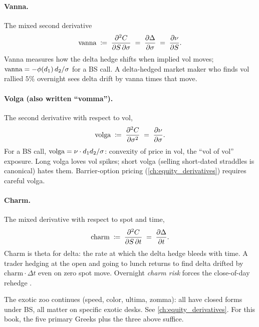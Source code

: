 \paragraph{Vanna.}
The mixed second derivative
\begin{equation*}
  \text{vanna} \;\coloneqq\; \frac{\partial^2 C}{\partial S\,\partial \sigma}
                  \;=\; \frac{\partial \Delta}{\partial \sigma}
                  \;=\; \frac{\partial \nu}{\partial S}.
\end{equation*}
Vanna measures how the delta hedge shifts when implied vol moves;
$\text{vanna} = -\phi(d_1)\,d_2/\sigma$ for a BS call. A
delta-hedged market maker who finds vol rallied $5\%$ overnight
sees delta drift by vanna times that move.

\paragraph{Volga (also written ``vomma'').}
The second derivative with respect to vol,
\begin{equation*}
  \text{volga} \;\coloneqq\; \frac{\partial^2 C}{\partial \sigma^2}
                  \;=\; \frac{\partial \nu}{\partial \sigma}.
\end{equation*}
For a BS call, $\text{volga} = \nu \cdot d_1 d_2 / \sigma$:
convexity of price in vol, the ``vol of vol'' exposure. Long volga
loves vol spikes; short volga (selling short-dated straddles is
canonical) hates them. Barrier-option pricing
(\cref{ch:equity_derivatives}) requires careful volga.

\paragraph{Charm.}
The mixed derivative with respect to spot and time,
\begin{equation*}
  \text{charm} \;\coloneqq\; \frac{\partial^2 C}{\partial S\,\partial t}
                  \;=\; \frac{\partial \Delta}{\partial t}.
\end{equation*}
Charm is theta for delta: the rate at which the delta hedge
bleeds with time. A trader hedging at the open and going to lunch
returns to find delta drifted by $\text{charm} \cdot \Delta t$
even on zero spot move. Overnight \emph{charm risk} forces the
close-of-day rehedge \citeHull.

The exotic zoo continues (speed, color, ultima, zomma): all have
closed forms under BS, all matter on specific exotic desks. See
\cref{ch:equity_derivatives}. For this book, the five primary
Greeks plus the three above suffice.

